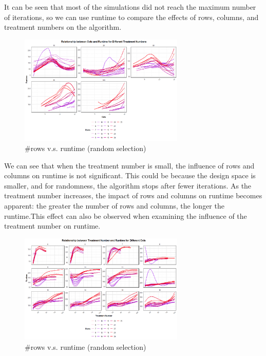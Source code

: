 \documentclass[
  a4paper,
  oneside,
  openany,
  12pt,
  onecolumn]{book}
\theoremstyle{definition}
\theoremstyle{plain}
\theoremstyle{remark}
\begin{document}
It can be seen that most of the simulations did not reach the maximum
number of iterations, so we can use runtime to compare the effects of
rows, columns, and treatment numbers on the algorithm.

\begin{figure}[H]

{\centering \includegraphics[width=0.7\textwidth,height=\textheight]{images/Rplots/SA-Fast-eva/SA-Fast-row-vs-runtime.png}

}

\caption{\#rows v.s. runtime (random selection)}

\end{figure}%

We can see that when the treatment number is small, the influence of
rows and columns on runtime is not significant. This could be because
the design space is smaller, and for randomness, the algorithm stops
after fewer iterations. As the treatment number increases, the impact of
rows and columns on runtime becomes apparent: the greater the number of
rows and columns, the longer the runtime.This effect can also be
observed when examining the influence of the treatment number on
runtime.

\begin{figure}[H]

{\centering \includegraphics[width=0.7\textwidth,height=\textheight]{images/Rplots/SA-Fast-eva/SA-Fast-trt-vs-runtime.png}

}

\caption{\#rows v.s. runtime (random selection)}

\end{figure}%
\end{document}

